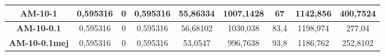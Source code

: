 \documentclass[12pt, spanish]{article}
\begin{document}
\begin{table}[H]
\begin{tabular}{|c|c|c|c|c|c|c|c|c|}
\textbf{AM-10-1}      & 0,595316                  & 0                           & 0,595316               & 55,86334   & 1007,1428                 & 67                          & 1142,856               & 400,7524   \\ \hline
\textbf{AM-10-0.1}    & 0,595316                  & 0                           & 0,595316               & 56,68102   & 1030,038                  & 83,4                        & 1198,974               & 277,04     \\ \hline
\textbf{AM-10-0.1mej} & 0,595316                  & 0                           & 0,595316               & 53,0547    & 996,7638                  & 93,8                        & 1186,762               & 252,8102   \\ \hline
\end{tabular}
\end{table}
\end{document}
